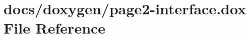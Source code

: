 \hypertarget{page2-interface_8dox}{\section{docs/doxygen/page2-\/interface.dox File Reference}
\label{page2-interface_8dox}
}

